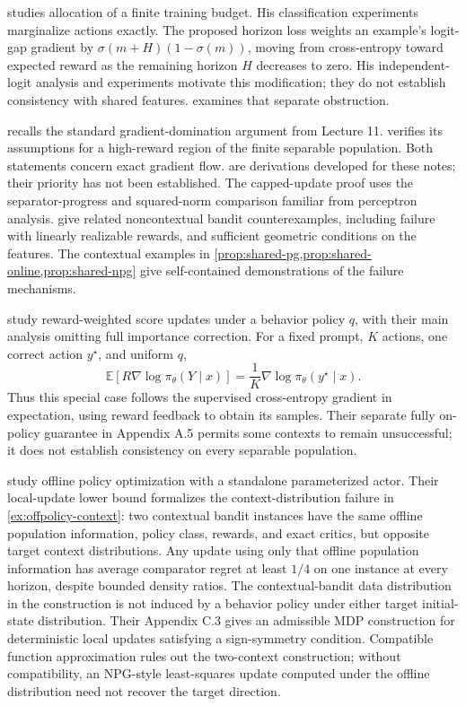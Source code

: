 \documentclass[11pt,twoside]{article}
\newcommand{\E}{\mathbb E}
\theoremstyle{definition}
\theoremstyle{remark}
\begin{document}
\citet{osband2026} studies allocation of a finite training budget. His
classification experiments marginalize actions exactly. The proposed
horizon loss weights an example's logit-gap gradient by
$\sigma(m+H)(1-\sigma(m))$, moving from cross-entropy toward expected
reward as the remaining horizon $H$ decreases to zero. His independent-logit
analysis and experiments motivate this modification; they do not establish
consistency with shared features.  examines that separate
obstruction.

 recalls the standard gradient-domination argument
from Lecture 11.  verifies its assumptions for
a high-reward region of the finite separable population. Both statements
concern exact gradient flow. 
are derivations developed for these notes; their priority has not been
established. The capped-update proof uses the separator-progress and
squared-norm comparison familiar from perceptron analysis.
\citet{lin2026draft} give related noncontextual bandit counterexamples,
including failure with linearly realizable rewards, and sufficient geometric
conditions on the features. The contextual examples in
\cref{prop:shared-pg,prop:shared-online,prop:shared-npg} give self-contained
demonstrations of the failure mechanisms.

\citet{mousavi2026} study reward-weighted score updates under a behavior
policy $q$, with their main analysis omitting full importance correction.
For a fixed prompt, $K$ actions, one correct action $y^\star$, and uniform $q$,
\[
 \E[R\nabla\log\pi_\theta(Y\mid x)]
 =\frac1K\nabla\log\pi_\theta(y^\star\mid x).
\]
Thus this special case follows the supervised cross-entropy gradient in
expectation, using reward feedback to obtain its samples. Their separate
fully on-policy guarantee in Appendix A.5 permits some contexts to remain
unsuccessful; it does not establish consistency on every separable population.

\citet{li2026offlinepg} study offline policy optimization with a standalone
parameterized actor. Their local-update lower bound formalizes the
context-distribution failure in \cref{ex:offpolicy-context}: two contextual
bandit instances have the same offline population information, policy class,
rewards, and exact critics, but opposite target context distributions. Any
update using only that offline population information has average comparator
regret at least $1/4$ on one instance at every horizon, despite bounded density
ratios. The contextual-bandit data distribution in the construction is not
induced by a behavior policy under either target initial-state distribution.
Their Appendix C.3 gives an admissible MDP construction for deterministic
local updates satisfying a sign-symmetry condition. Compatible function
approximation rules out the two-context construction; without compatibility,
an NPG-style least-squares update computed under the offline distribution need
not recover the target direction.
\end{document}

